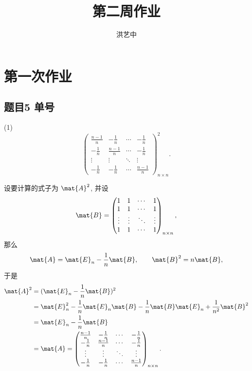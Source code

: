 \title{第二周作业}
\author{洪艺中}
\maketitle
\section{第一次作业}
\subsection*{题目5 单号}
\begin{problem*}
(1) 
\[
\begin{pmatrix}
    \frac{n - 1}{n} & -\frac{1}{n} & \cdots & -\frac{1}{n} \\
    -\frac{1}{n} & \frac{n - 1}{n} & \cdots & -\frac{1}{n} \\
    \vdots & \vdots & \ddots & \vdots \\
    -\frac{1}{n} & -\frac{1}{n} & \cdots & \frac{n - 1}{n}
\end{pmatrix}_{n \times n}^2.
\]
\end{problem*}
\begin{solution}
    设要计算的式子为 $\mat{A}^2$, 并设
\[
\mat{B} = 
\begin{pmatrix}
    1 & 1 & \cdots & 1 \\
    1 & 1 & \cdots & 1 \\
    \vdots & \vdots & \ddots & \vdots \\
    1 & 1 & \cdots & 1
\end{pmatrix}_{n \times n},
\]
那么
\[
    \mat{A} = \mat{E}_n - \frac{1}{n}\mat{B}, \qquad \mat{B}^2 = n\mat{B},
\]
于是
\[
\begin{aligned}
    \mat{A}^2 
    ={}& (\mat{E}_n - \frac{1}{n}\mat{B})^2 \\
    ={}& \mat{E}_n^2 - \frac{1}{n}\mat{E}_n\mat{B} - \frac{1}{n}\mat{B}\mat{E}_n + \frac{1}{n^2}\mat{B}^2 \\
    ={}& \mat{E}_n - \frac{1}{n}\mat{B} \\
    ={}& \mat{A} =
    \begin{pmatrix}
        \frac{n - 1}{n} & -\frac{1}{n} & \cdots & -\frac{1}{n} \\
        -\frac{1}{n} & \frac{n - 1}{n} & \cdots & -\frac{1}{n} \\
        \vdots & \vdots & \ddots & \vdots \\
        -\frac{1}{n} & -\frac{1}{n} & \cdots & \frac{n - 1}{n}
    \end{pmatrix}_{n \times n}.
\end{aligned}
\]
\end{solution}

